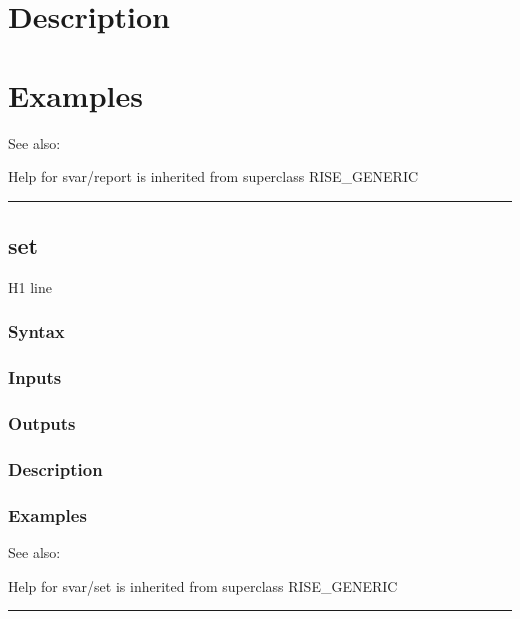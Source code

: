 \documentclass[letterpaper,10pt,english]{sphinxmanual}
\begin{document}
\section{Description}
\label{classes/models/@svar/svar:id101}

\section{Examples}
\label{classes/models/@svar/svar:id102}
See also:

Help for svar/report is inherited from superclass RISE\_GENERIC


\bigskip\hrule{}\bigskip



\subsection{set}
\label{classes/models/@svar/svar:id103}\label{classes/models/@svar/svar:set}
H1 line


\subsubsection{Syntax}
\label{classes/models/@svar/svar:id104}

\subsubsection{Inputs}
\label{classes/models/@svar/svar:id105}

\subsubsection{Outputs}
\label{classes/models/@svar/svar:id106}

\subsubsection{Description}
\label{classes/models/@svar/svar:id107}

\subsubsection{Examples}
\label{classes/models/@svar/svar:id108}
See also:

Help for svar/set is inherited from superclass RISE\_GENERIC


\bigskip\hrule{}\bigskip
\end{document}
